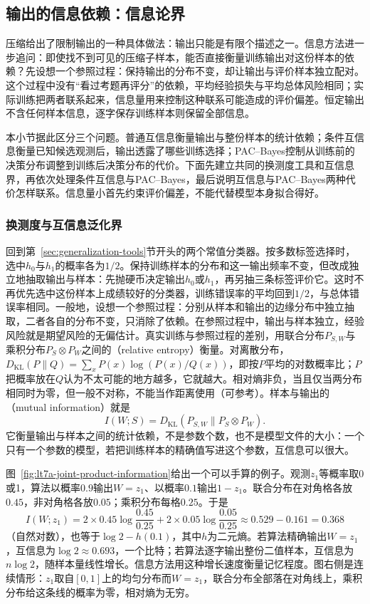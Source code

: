 \subsection{输出的信息依赖：信息论界}
\label{sec:information-stability}

压缩给出了限制输出的一种具体做法：输出只能是有限个描述之一。信息方法进一步追问：即使找不到可见的压缩子样本，能否直接衡量训练输出对这份样本的依赖？先设想一个参照过程：保持输出的分布不变，却让输出与评价样本独立配对。这个过程中没有“看过考题再评分”的依赖，平均经验损失与平均总体风险相同；实际训练把两者联系起来，信息量用来控制这种联系可能造成的评价偏差。恒定输出不含任何样本信息，逐字保存训练样本则保留全部信息。

本小节据此区分三个问题。普通互信息衡量输出与整份样本的统计依赖；条件互信息衡量已知候选观测后，输出透露了哪些训练选择；PAC--Bayes控制从训练前的决策分布调整到训练后决策分布的代价。下面先建立共同的换测度工具和互信息界，再依次处理条件互信息与PAC--Bayes，最后说明互信息与PAC--Bayes两种代价怎样联系。信息量小首先约束评价偏差，不能代替模型本身拟合得好。

\subsubsection{换测度与互信息泛化界}

回到第~\ref{sec:generalization-tools}节开头的两个常值分类器。按多数标签选择时，选中$h_0$与$h_1$的概率各为$1/2$。保持训练样本的分布和这一输出频率不变，但改成独立地抽取输出与样本：先抛硬币决定输出$h_0$或$h_1$，再另抽三条标签评价它。这时不再优先选中这份样本上成绩较好的分类器，训练错误率的平均回到$1/2$，与总体错误率相同。一般地，设想一个参照过程：分别从样本和输出的边缘分布中独立抽取，二者各自的分布不变，只消除了依赖。在参照过程中，输出与样本独立，经验风险就是期望风险的无偏估计。真实训练与参照过程的差别，用联合分布$P_{S,W}$与乘积分布$P_S\otimes P_W$之间的（relative entropy）衡量。对离散分布，$D_{\mathrm{KL}}(P\|Q)=\sum_xP(x)\log(P(x)/Q(x))$，即按$P$平均的对数概率比；$P$把概率放在$Q$认为不太可能的地方越多，它就越大。相对熵非负，当且仅当两分布相同时为零，但一般不对称，不能当作距离使用（可参考）。样本与输出的（mutual information）就是
\[
 I(W;S)=D_{\mathrm{KL}}(P_{S,W}\|P_S\otimes P_W).
\]
它衡量输出与样本之间的统计依赖，不是参数个数，也不是模型文件的大小：一个只有一个参数的模型，若把训练样本的精确值写进这个参数，互信息可以很大。

图~\ref{fig:lt7a-joint-product-information}给出一个可以手算的例子。观测$z_1$等概率取0或1，算法以概率$0.9$输出$W=z_1$、以概率$0.1$输出$1-z_1$。联合分布在对角格各放$0.45$，非对角格各放$0.05$；乘积分布每格$0.25$。于是
\[
 I(W;z_1)=2\times0.45\log\frac{0.45}{0.25}+2\times0.05\log\frac{0.05}{0.25}\approx0.529-0.161=0.368
\]
（自然对数），也等于$\log2-h(0.1)$，其中$h$为二元熵。若算法精确输出$W=z_1$，互信息为$\log2\approx0.693$，一个比特；若算法逐字输出整份二值样本，互信息为$n\log2$，随样本量线性增长。信息方法用这种增长速度衡量记忆程度。图右侧是连续情形：$z_1$取自$[0,1]$上的均匀分布而$W=z_1$，联合分布全部落在对角线上，乘积分布给这条线的概率为零，相对熵为无穷。


